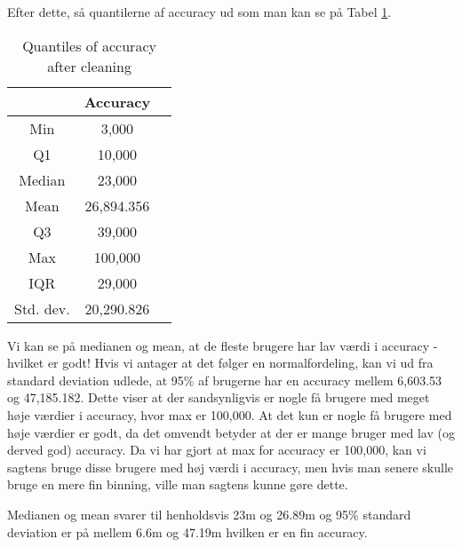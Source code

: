 Efter dette, så quantilerne af accuracy ud som man kan se på Tabel \ref{tab:acc_quantiles}. 
 \begin{table}[htbp]
        \centering
        \small
        \setlength\tabcolsep{2pt}
        \begin{tabular}{|c|c|c|}
            \hline
                         & Accuracy      \\[-1pt]
            \hline
                 Min     &  3,000       \\
            \hline
                 Q1      &  10,000   \\
            \hline
                 Median  &  23,000    \\
            \hline
                 Mean    &  26,894.356    \\
            \hline
                 Q3      &  39,000      \\
            \hline
                 Max &  100,000   \\
            \hline
                 IQR     &   29,000     \\
            \hline
                Std. dev.  &  20,290.826   \\
            \hline
        \end{tabular}
        \caption{Quantiles of accuracy after cleaning} %
        \label{tab:acc_quantiles}
\end{table}

Vi kan se på medianen og mean, at de fleste brugere har lav værdi i accuracy - hvilket er godt! Hvis vi antager at det følger en normalfordeling, kan vi ud fra standard deviation udlede, at 95\% af brugerne har en accuracy mellem 6,603.53 og 47,185.182. Dette viser at der sandsynligvis er nogle få brugere med meget høje værdier i accuracy, hvor max er 100,000. At det kun er nogle få brugere med høje værdier er godt, da det omvendt betyder at der er mange bruger med lav (og derved god) accuracy. Da vi har gjort at max for accuracy er 100,000, kan vi sagtens bruge disse brugere med høj værdi i accuracy, men hvis man senere skulle bruge en mere fin binning, ville man sagtens kunne gøre dette.  

Medianen og mean svarer til henholdsvis 23m og 26.89m og 95\% standard deviation er på mellem 6.6m og 47.19m hvilken er en fin accuracy. 


